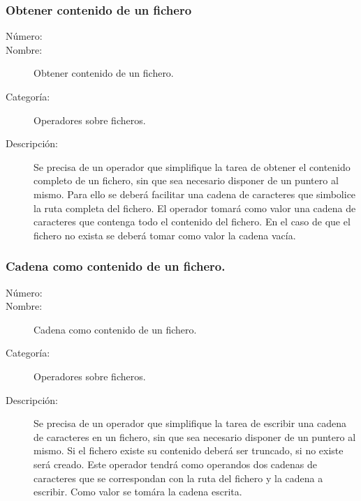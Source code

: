 \subsubsection{Obtener contenido de un fichero}
\begin{framed}
	\begin{description}
		\item [Número:] \cn
		\item [Nombre:] Obtener contenido de un fichero.
		\item [Categoría:] Operadores sobre ficheros.
		\item [Descripción:] Se precisa de un operador que simplifique la tarea de obtener el contenido completo de un fichero, sin que sea necesario disponer de un 
		puntero al mismo. Para ello se deberá facilitar una cadena de caracteres que simbolice la ruta completa del fichero. El operador tomará como valor
		una cadena de caracteres que contenga todo el contenido del fichero. En el caso de que el fichero no exista se deberá tomar como valor la cadena vacía.
	\end{description}
\end{framed}

\subsubsection{Cadena como contenido de un fichero.}
\begin{framed}
	\begin{description}
		\item [Número:] \cn
		\item [Nombre:] Cadena como contenido de un fichero.
		\item [Categoría:] Operadores sobre ficheros.
		\item [Descripción:] Se precisa de un operador que simplifique la tarea de escribir una cadena de caracteres en un fichero, sin que sea necesario 
		disponer de un puntero al mismo. Si el fichero existe su contenido deberá ser truncado, si no existe será creado. Este operador tendrá como operandos dos cadenas 
		de caracteres que se correspondan con la ruta del fichero y la cadena a escribir. Como valor se tomára la cadena escrita.
	\end{description}
\end{framed}

